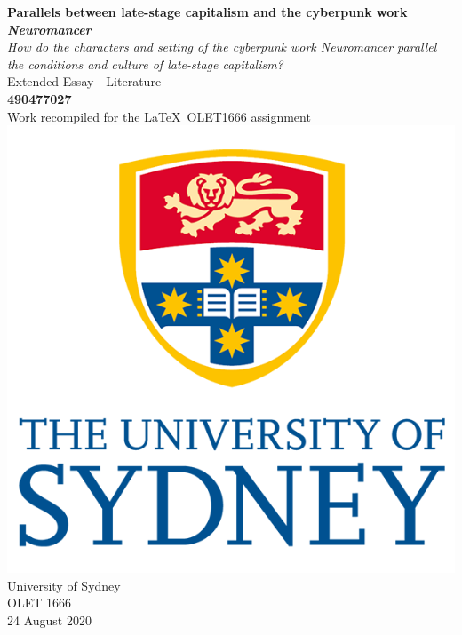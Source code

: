 \documentclass[11pt]{article}
\begin{document}
	\begin{titlepage}
		\begin{center}
			\textbf{\Huge Parallels between late-stage capitalism and the cyberpunk work \textit{Neuromancer}}\\
			\Large\textit{How do the characters and setting of the cyberpunk work \emph{Neuromancer} parallel the conditions and culture of late-stage capitalism?}\\
			\vspace{2cm}
			\Large Extended Essay - Literature\\
			\vspace{1cm}
			\textbf{\Large 490477027}\\
			\vspace{1cm}
			\large Work recompiled for the \LaTeX\ OLET1666 assignment\\
			\vspace{1cm}
			\includegraphics{usydlogo}\\
			\vspace{1cm}
			\large University of Sydney\\
			\large OLET 1666\\
			\large 24 August 2020\\
		\end{center}
	\end{titlepage}
	
\end{document}
